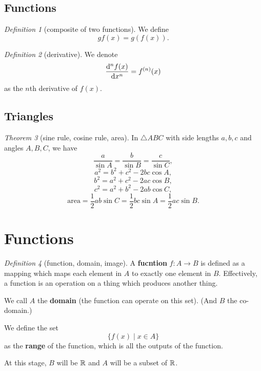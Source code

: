\documentclass[8pt]{article}
\theoremstyle{remark}
\newtheorem{theorem}{Theorem}[section]
\newtheorem{definition}[theorem]{Definition}
\begin{document}
        \subsection{Functions}
            \begin{definition}[composite of two functions]
                We define
                $$
                    gf(x) = g(f(x)).
                $$
            \end{definition}

            \begin{definition}[derivative]
                We denote
                $$
                    \frac{\mathrm{d}^n f(x)}{\mathrm{d} x^n} = f^{(n)} (x)
                $$
                as the $n$th derivative of $f(x)$.
            \end{definition}

        \subsection{Triangles}
            \begin{theorem}[sine rule, cosine rule, area]
                In $\triangle ABC$ with side lengths $a, b, c$ and angles $A, B, C$, we have
                $$
                    \frac{a}{\sin A} = \frac{b}{\sin B} = \frac{c}{\sin C},
                $$
                $$
                    a^2 = b^2 + c^2 - 2bc \cos A,
                $$
                $$
                    b^2 = a^2 + c^2 - 2ac \cos B,
                $$
                $$
                    c^2 = a^2 + b^2 - 2ab \cos C,
                $$
                $$
                    \text{area}=\frac{1}{2} ab \sin C = \frac{1}{2} bc \sin A = \frac{1}{2} ac \sin B.
                $$
            \end{theorem}

    \section{Functions}

        \begin{definition}[function, domain, image]
            A \textbf{fucntion} $f: A \rightarrow B$ is defined as a mapping which maps each element in $A$ to exactly one element in $B$. Effectively, a function is an operation on a thing which produces another thing.

            We call $A$ the \textbf{domain} (the function can operate on this set). (And $B$ the co-domain.)

            We define the set
            $$
                \{f(x) \mid x \in A\}
            $$
            as the \textbf{range} of the function, which is all the outputs of the function.

            At this stage, $B$ will be $\mathbb{R}$ and $A$ will be a subset of $\mathbb{R}$.
        \end{definition}
\end{document}
